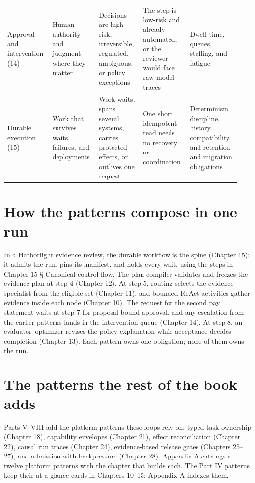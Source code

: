 \begin{longtable}{@{}Y{0.1880\linewidth}Y{0.1880\linewidth}Y{0.1880\linewidth}Y{0.1880\linewidth}Y{0.1880\linewidth}@{}}
Approval and intervention (14) & Human authority and judgment where they matter & Decisions are high-risk, irreversible, regulated, ambiguous, or policy exceptions & The step is low-risk and already automated, or the reviewer would face raw model traces & Dwell time, queues, staffing, and fatigue \\
Durable execution (15) & Work that survives waits, failures, and deployments & Work waits, spans several systems, carries protected effects, or outlives one request & One short idempotent read needs no recovery or coordination & Determinism discipline, history compatibility, and retention and migration obligations \\
\end{longtable}
\BookTableEnd

\section{How the patterns compose in one run}

In a Harborlight evidence review, the durable workflow is the spine (Chapter 15): it admits the run, pins its manifest, and holds every wait, using the steps in Chapter 15 § Canonical control flow. The plan compiler validates and freezes the evidence plan at step 4 (Chapter 12). At step 5, routing selects the evidence specialist from the eligible set (Chapter 11), and bounded ReAct activities gather evidence inside each node (Chapter 10). The request for the second pay statement waits at step 7 for proposal-bound approval, and any escalation from the earlier patterns lands in the intervention queue (Chapter 14). At step 8, an evaluator–optimizer revises the policy explanation while acceptance decides completion (Chapter 13). Each pattern owns one obligation; none of them owns the run.\par

\section{The patterns the rest of the book adds}

Parts V–VIII add the platform patterns these loops rely on: typed task ownership (Chapter 18), capability envelopes (Chapter 21), effect reconciliation (Chapter 22), causal run traces (Chapter 24), evidence-based release gates (Chapters 25–27), and admission with backpressure (Chapter 28). Appendix A catalogs all twelve platform patterns with the chapter that builds each. The Part IV patterns keep their at-a-glance cards in Chapters 10–15; Appendix A indexes them.\par

